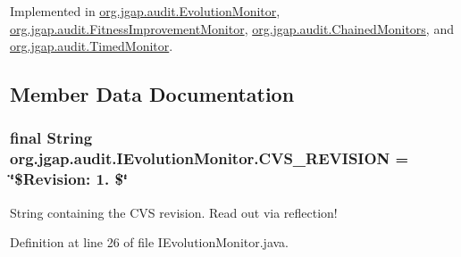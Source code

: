 Implemented in \hyperlink{classorg_1_1jgap_1_1audit_1_1_evolution_monitor_a37fea3677480717e2af5a3a31a5e4ca9}{org.\-jgap.\-audit.\-Evolution\-Monitor}, \hyperlink{classorg_1_1jgap_1_1audit_1_1_fitness_improvement_monitor_ad6cb6476edbc08de0e1864d470d225e3}{org.\-jgap.\-audit.\-Fitness\-Improvement\-Monitor}, \hyperlink{classorg_1_1jgap_1_1audit_1_1_chained_monitors_ad4fa7086f56505222c788d88a0fa7e6d}{org.\-jgap.\-audit.\-Chained\-Monitors}, and \hyperlink{classorg_1_1jgap_1_1audit_1_1_timed_monitor_a41c579ad3f3e15ccfece260de6090503}{org.\-jgap.\-audit.\-Timed\-Monitor}.



\subsection{Member Data Documentation}
\hypertarget{interfaceorg_1_1jgap_1_1audit_1_1_i_evolution_monitor_a7fbd292e0d067b82eb5de8d6ee84c634}{
\subsubsection[{C\-V\-S\-\_\-\-R\-E\-V\-I\-S\-I\-O\-N}]{\setlength{\rightskip}{0pt plus 5cm}final String org.\-jgap.\-audit.\-I\-Evolution\-Monitor.\-C\-V\-S\-\_\-\-R\-E\-V\-I\-S\-I\-O\-N = \char`\"{}\$Revision\-: 1. \$\char`\"{}\hspace{0.3cm}{\ttfamily [static]}}}\label{interfaceorg_1_1jgap_1_1audit_1_1_i_evolution_monitor_a7fbd292e0d067b82eb5de8d6ee84c634}
String containing the C\-V\-S revision. Read out via reflection! 

Definition at line 26 of file I\-Evolution\-Monitor.\-java.

